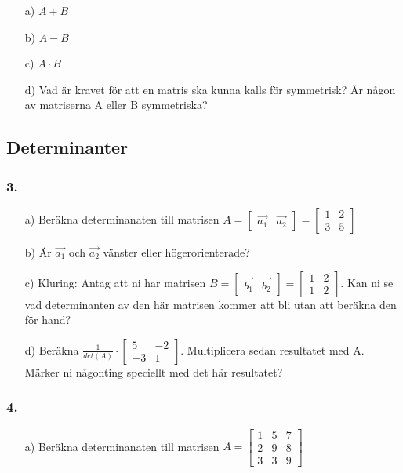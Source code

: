 \documentclass{article}
\begin{document}
\begin{itemize}
	\item[a) ] $A+B$
	\item[b) ] $A-B$
	\item[c) ] $A \cdot B$
	\item[d) ] Vad är kravet för att en matris ska kunna kalls för symmetrisk? Är någon av matriserna A eller B symmetriska?
\end{itemize}

\subsection*{Determinanter}
\subsubsection*{3.}
\begin{itemize}
	\item[a) ] Beräkna determinanaten till matrisen $A = \begin{bmatrix} \vec{a_1} & \vec{a_2}\end{bmatrix} =\begin{bmatrix}1 & 2 \\ 3 & 5\end{bmatrix}$
	\item[b) ] Är $\vec{a_1}$ och $\vec{a_2}$ vänster eller högerorienterade?
	\item[c) ] Kluring: Antag att ni har matrisen $B = \begin{bmatrix} \vec{b_1} & \vec{b_2}\end{bmatrix} =\begin{bmatrix}1 & 2 \\ 1 & 2\end{bmatrix}$. Kan ni se vad determinanten av den här matrisen kommer att bli utan att beräkna den för hand?
	\item[d) ] Beräkna $\frac{1}{det(A)} \cdot \begin{bmatrix}5 & -2 \\ -3 & 1\end{bmatrix}$. Multiplicera sedan resultatet med A. Märker ni någonting speciellt med det här resultatet?
\end{itemize}

\subsubsection*{4.}
\begin{itemize}
	\item[a) ] Beräkna determinanaten till matrisen $A=\begin{bmatrix}1 & 5 & 7\\ 2 & 9 & 8 \\ 3 & 3 & 9\end{bmatrix}$
\end{itemize}
\end{document}
